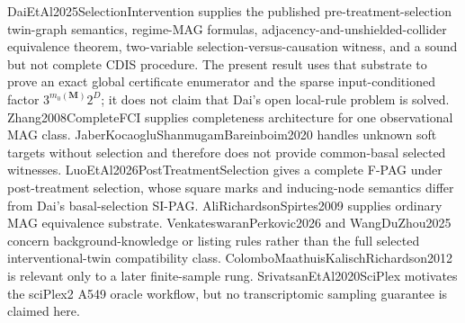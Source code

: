 DaiEtAl2025SelectionIntervention supplies the published pre-treatment-selection twin-graph semantics, regime-MAG formulas, adjacency-and-unshielded-collider equivalence theorem, two-variable selection-versus-causation witness, and a sound but not complete CDIS procedure.  The present result uses that substrate to prove an exact global certificate enumerator and the sparse input-conditioned factor \(3^{m_0(\mathbf M)}2^D\); it does not claim that Dai's open local-rule problem is solved.  Zhang2008CompleteFCI supplies completeness architecture for one observational MAG class.  JaberKocaogluShanmugamBareinboim2020 handles unknown soft targets without selection and therefore does not provide common-basal selected witnesses.  LuoEtAl2026PostTreatmentSelection gives a complete F-PAG under post-treatment selection, whose square marks and inducing-node semantics differ from Dai's basal-selection SI-PAG.  AliRichardsonSpirtes2009 supplies ordinary MAG equivalence substrate.  VenkateswaranPerkovic2026 and WangDuZhou2025 concern background-knowledge or listing rules rather than the full selected interventional-twin compatibility class.  ColomboMaathuisKalischRichardson2012 is relevant only to a later finite-sample rung.  SrivatsanEtAl2020SciPlex motivates the sciPlex2 A549 oracle workflow, but no transcriptomic sampling guarantee is claimed here.